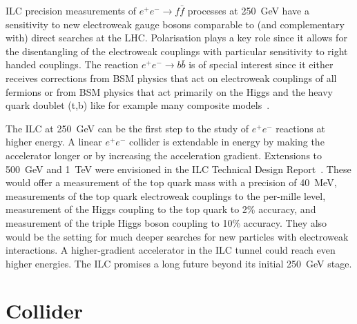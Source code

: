 \documentclass[%
 reprint,
 amsmath,amssymb,
 aps,
]{revtex4-1}
\newcommand{\todo}[1]{\textcolor{red}{{#1}}}
\def\ee{e^+e^-}
\begin{document}
ILC precision measurements of $\ee\to f\bar f$ processes at 250~GeV have a sensitivity to new
electroweak gauge bosons comparable to (and complementary with) 
direct searches at the LHC.  Polarisation plays a key role since it allows for the disentangling of the electroweak couplings with particular sensitivity to right handed couplings. The reaction $\ee\to b\bar b$ 
is of special interest since it either receives corrections from BSM physics that act on electroweak couplings of all fermions or from BSM physics that act primarily on the Higgs and the heavy quark doublet (t,b) like for example many composite models~\cite{eetobb1,eetobb2}. 

The ILC at 250~GeV can be the first step to the study of $\ee$
reactions at higher energy.   A linear $\ee$ collider is extendable in
energy by making the accelerator longer or by increasing the
acceleration gradient. Extensions to 500~GeV and 1~TeV were envisioned
in the ILC Technical Design Report~\cite{Behnke:2013xla}.    These would offer a
measurement of the top quark mass with a precision of 40~MeV, measurements of the top
quark electroweak couplings to the per-mille level, measurement of the
Higgs coupling to the top quark to 2\% accuracy, and measurement of
the triple Higgs boson coupling to 10\%  accuracy. They  also would be
the setting for much 
deeper searches for new particles with electroweak interactions.
A higher-gradient accelerator in the ILC tunnel could reach even
higher energies.  The
ILC promises a long future beyond its initial 250~GeV stage.





\section{\label{sec:collider}Collider}

\end{document}
